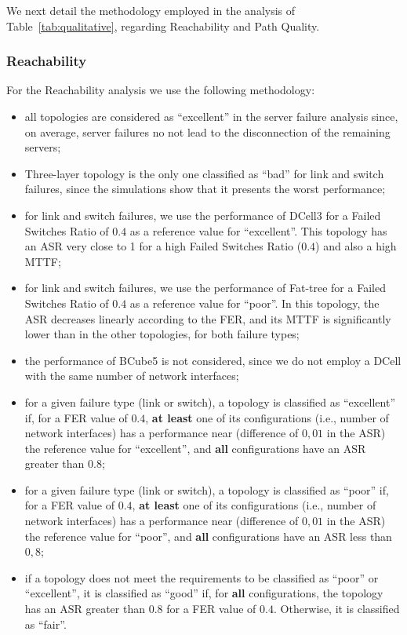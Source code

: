 We next detail the methodology employed in the analysis of Table~\ref{tab:qualitative}, regarding Reachability and Path Quality.

\subsubsection{Reachability}

For the Reachability analysis we use the following methodology:

\begin{itemize}
\item all topologies are considered as ``excellent'' in the server failure analysis since, on average, server failures no not lead to the disconnection of the remaining servers;
\item Three-layer topology is the only one classified as ``bad'' for link and switch failures, since the simulations show that it presents the worst performance;
\item for link and switch failures, we use the performance of DCell3 for a Failed Switches Ratio of $0.4$ as a reference value for ``excellent''. This topology has an ASR very close to 1 for a high Failed Switches Ratio ($0.4$) and also a high MTTF;
\item for link and switch failures, we use the performance of Fat-tree for a Failed Switches Ratio of $0.4$ as a reference value for ``poor''. In this topology, the ASR decreases linearly according to the FER, and its MTTF is significantly lower than in the other topologies, for both failure types;
\item the performance of BCube5 is not considered, since we do not employ a DCell with the same number of network interfaces;
\item for a given failure type (link or switch), a topology is classified as ``excellent'' if, for a FER value of $0.4$, \textbf{at least} one of its configurations (i.e., number of network interfaces) has a performance near (difference of $0,01$ in the ASR) the reference value for ``excellent'', and \textbf{all} configurations have an ASR greater than $0.8$; 
\item for a given failure type (link or switch), a topology is classified as ``poor'' if, for a FER value of $0.4$, \textbf{at least} one of its configurations (i.e., number of network interfaces) has a performance near (difference of $0,01$ in the ASR) the reference value for ``poor'',  and \textbf{all} configurations have an ASR less than $0,8$;
\item if a topology does not meet the requirements to be classified as ``poor'' or ``excellent'', it is classified as  ``good'' if, for \textbf{all} configurations, the topology has an ASR greater than $0.8$ for a FER value of $0.4$. Otherwise, it is classified as ``fair''.
\end{itemize}


